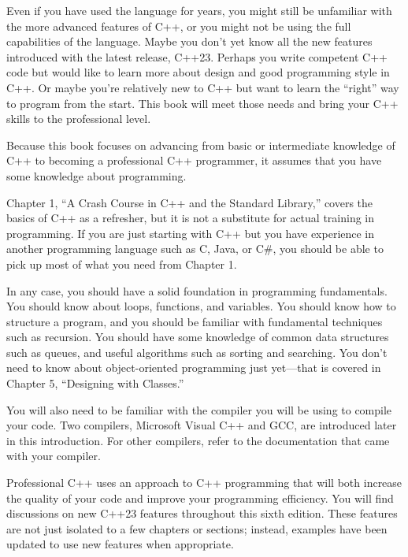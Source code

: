 
Even if you have used the language for years, you might still be unfamiliar with the more advanced features of C++, or you might not be using the full capabilities of the language. Maybe you don’t yet know all the new features introduced with the latest release, C++23. Perhaps you write competent C++ code but would like to learn more about design and good programming style in C++. Or maybe you’re relatively new to C++ but want to learn the “right” way to program from the start. This book will meet those needs and bring your C++ skills to the professional level.

Because this book focuses on advancing from basic or intermediate knowledge of C++ to becoming a professional C++ programmer, it assumes that you have some knowledge about programming.

Chapter 1, “A Crash Course in C++ and the Standard Library,” covers the basics of C++ as a refresher, but it is not a substitute for actual training in programming. If you are just starting with C++ but you have experience in another programming language such as C, Java, or C\#, you should be able to pick up most of what you need from Chapter 1.

In any case, you should have a solid foundation in programming fundamentals. You should know about loops, functions, and variables. You should know how to structure a program, and you should be familiar with fundamental techniques such as recursion. You should have some knowledge of common data structures such as queues, and useful algorithms such as sorting and searching. You don’t need to know about object-oriented programming just yet—that is covered in Chapter 5, “Designing with Classes.”

You will also need to be familiar with the compiler you will be using to compile your code. Two compilers, Microsoft Visual C++ and GCC, are introduced later in this introduction. For other compilers, refer to the documentation that came with your compiler.


Professional C++ uses an approach to C++ programming that will both increase the quality of your code and improve your programming efficiency. You will find discussions on new C++23 features throughout this sixth edition. These features are not just isolated to a few chapters or sections; instead, examples have been updated to use new features when appropriate.

